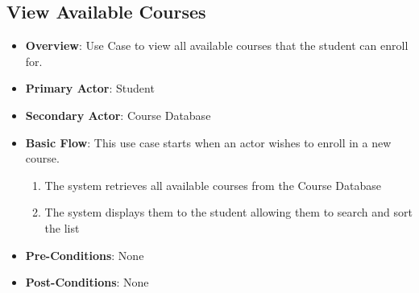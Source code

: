 \documentclass[12pt, a4]{article}
\begin{document}

\subsection{View Available Courses}
\begin{itemize}
    \item \textbf{Overview}: Use Case to view all available courses that the student can enroll for.
    \item \textbf{Primary Actor}: Student
    \item \textbf{Secondary Actor}: Course Database
    \item \textbf{Basic Flow}: This use case starts when an actor wishes to enroll in a new course.
        \begin{enumerate}
            \item The system retrieves all available courses from the Course Database
            \item The system displays them to the student allowing them to search and sort the list
        \end{enumerate}
    \item \textbf{Pre-Conditions}: None
    \item \textbf{Post-Conditions}: None
\end{itemize}
\end{document}

